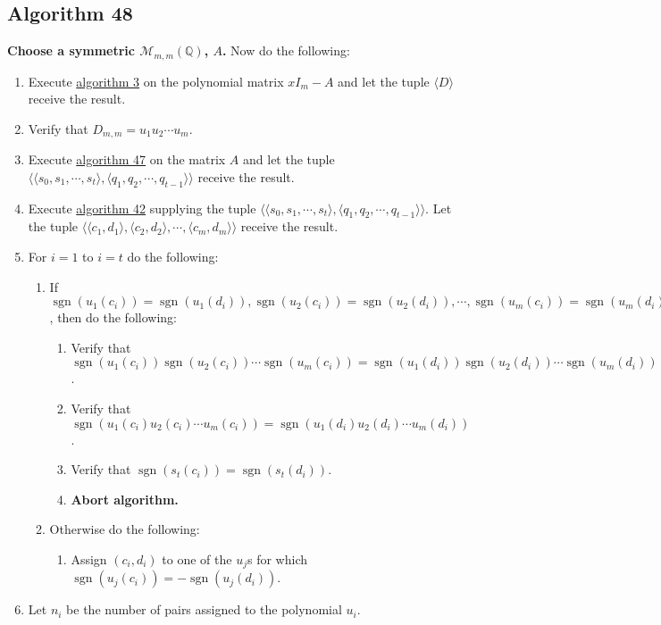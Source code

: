 \documentclass[twocolumn]{article}
\DeclareMathOperator{\sgn}{sgn}
\begin{document}
		\subsection{Algorithm 48}\label{sec:algorithm 48}
			\textbf{Choose a symmetric $\mathcal{M}_{m,m}(\mathbb{Q})$, $A$.} Now do the following:
			\begin{enumerate}
				\item Execute \hyperref[sec:algorithm 3]{algorithm 3} on the polynomial matrix $xI_m-A$ and let the tuple $\langle D\rangle$ receive the result.
				\item Verify that $D_{m,m}=u_1u_2\cdots u_m$.
				\item Execute \hyperref[sec:algorithm 47]{algorithm 47} on the matrix $A$ and let the tuple $\langle \langle s_0,s_1,\cdots,s_t\rangle,\langle q_1,q_2,\cdots,q_{t-1}\rangle\rangle$ receive the result.
				\item Execute \hyperref[sec:algorithm 42]{algorithm 42} supplying the tuple $\langle \langle s_0,s_1,\cdots,s_t\rangle,\langle q_1,q_2,\cdots,q_{t-1}\rangle\rangle$. Let the tuple $\langle\langle c_1,d_1\rangle,\langle c_2,d_2\rangle,\cdots,\langle c_m,d_m\rangle\rangle$ receive the result.
				\item For $i=1$ to $i=t$ do the following:
				\begin{enumerate}
					\item If $\sgn(u_1(c_i))=\sgn(u_1(d_i)), \sgn(u_2(c_i))=\sgn(u_2(d_i)), \cdots, \sgn(u_m(c_i))=\sgn(u_m(d_i))$, then do the following:
					\begin{enumerate}
						\item Verify that $\sgn(u_1(c_i))\sgn(u_2(c_i))\cdots\sgn(u_m(c_i))=\sgn(u_1(d_i))\sgn(u_2(d_i))\cdots\sgn(u_m(d_i))$.
						\item Verify that $\sgn(u_1(c_i)u_2(c_i)\cdots u_m(c_i))=\sgn(u_1(d_i)u_2(d_i)\cdots u_m(d_i))$.
						\item Verify that $\sgn(s_t(c_i))=\sgn(s_t(d_i))$.
						\item \textbf{Abort algorithm.}
					\end{enumerate}
					\item Otherwise do the following:
					\begin{enumerate}
						\item Assign $(c_i,d_i)$ to one of the $u_j$s for which $\sgn(u_j(c_i))=-\sgn(u_j(d_i))$.
					\end{enumerate}
				\end{enumerate}
				\item Let $n_i$ be the number of pairs assigned to the polynomial $u_i$.

\end{enumerate}
\end{document}
